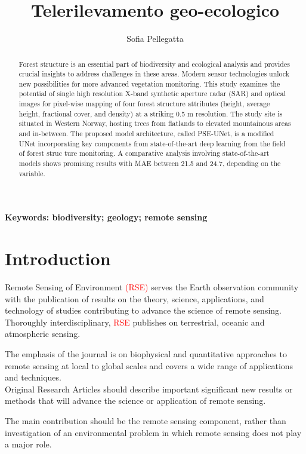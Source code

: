 \documentclass[a4paper, 12pt]{article}
\title{Telerilevamento geo-ecologico}
\author{Sofia Pellegatta}
\newcommand{\tr}{\textcolor{red}}
\begin{document}
\maketitle
\doublespacing
\tableofcontents
\begin{abstract}
    Forest structure is an essential part of biodiversity and ecological analysis and provides crucial insights to address
challenges in these areas. Modern sensor technologies unlock new possibilities for more advanced vegetation
monitoring. This study examines the potential of single high resolution X-band synthetic aperture radar (SAR)
and optical images for pixel-wise mapping of four forest structure attributes (height, average height, fractional
cover, and density) at a striking 0.5 m resolution. The study site is situated in Western Norway, hosting trees from
flatlands to elevated mountainous areas and in-between. The proposed model architecture, called PSE-UNet, is a
modified UNet incorporating key components from state-of-the-art deep learning from the field of forest struc
ture monitoring. A comparative analysis involving state-of-the-art models shows promising results with MAE%
between 21.5 and 24.7, depending on the variable.
\end{abstract}
\textbf{Keywords: biodiversity; geology; remote sensing}



\section{Introduction}\label{introduction}
Remote Sensing of Environment \textcolor{red}{(RSE)} serves the Earth observation community with the publication of results on the theory, science, applications, and technology of studies contributing to advance the science of remote sensing. Thoroughly interdisciplinary, \tr{RSE} publishes on terrestrial, oceanic and atmospheric sensing. 

The emphasis of the journal is on biophysical and quantitative approaches to remote sensing at local to global scales and covers a wide range of applications and techniques.\\

Original Research Articles should describe important significant new results or methods that will advance the science or application of remote sensing. 

\smallskip 
The main contribution should be the remote sensing component, rather than investigation of an environmental problem in which remote sensing does not play a major role. 
\end{document}

